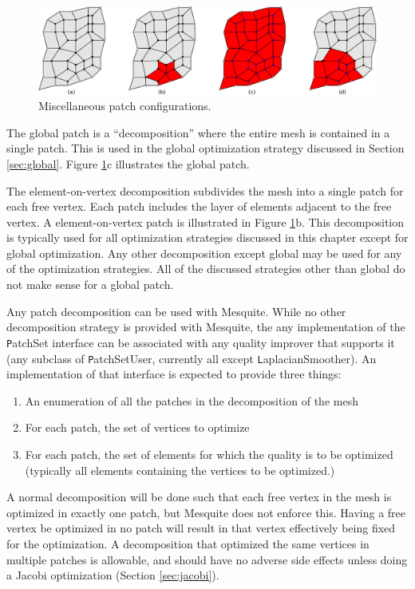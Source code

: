 \begin{figure}[htb]
\includegraphics[width=5in]{figures/patches-horiz}
\caption{Miscellaneous patch configurations.\label{fig:patch-types}}
\end{figure}

The global patch is a ``decomposition'' where the entire mesh is contained in a single patch.  This is used in the global optimization strategy discussed in Section \ref{sec:global}. Figure \ref{fig:patch-types}c illustrates the global patch.

The element-on-vertex decomposition subdivides the mesh into a single patch for each free vertex.  Each patch includes the layer of elements adjacent to the free vertex.  A element-on-vertex patch is illustrated in Figure \ref{fig:patch-types}b.  This decomposition is typically used for all optimization strategies discussed in this chapter except for global optimization.  Any other decomposition except global may be used for any of the optimization strategies.  All of the discussed strategies other than global do not make sense for a global patch.

Any patch decomposition can be used with Mesquite.  While no other decomposition strategy is provided with Mesquite, the any implementation of the {\texttt PatchSet} interface can be associated with any quality improver that supports it (any subclass of {\texttt PatchSetUser}, currently all except {\texttt LaplacianSmoother}).  An implementation of that interface is expected to provide three things:
\begin{enumerate}
\item An enumeration of all the patches in the decomposition of the mesh
\item For each patch, the set of vertices to optimize
\item For each patch, the set of elements for which the quality is to be optimized (typically all elements containing the vertices to be optimized.)
\end{enumerate}
A normal decomposition will be done such that each free vertex in the mesh is optimized in exactly one patch, but Mesquite does not enforce this.  Having a free vertex be optimized in no patch will result in that vertex effectively being fixed for the optimization.  A decomposition that optimized the same vertices in multiple patches is allowable, and should have no adverse side effects unless doing a Jacobi optimization (Section \ref{sec:jacobi}).

